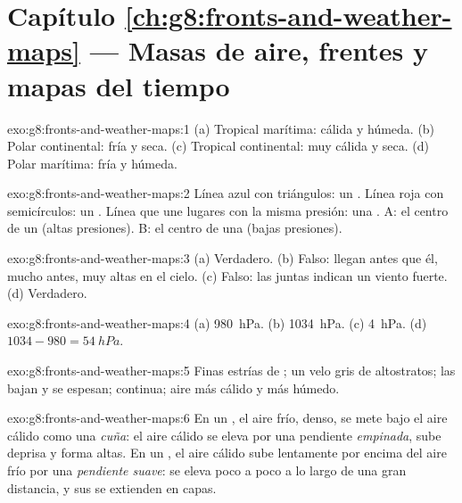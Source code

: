 \section*{Capítulo \ref{ch:g8:fronts-and-weather-maps} --- Masas de aire, frentes y mapas del tiempo}

\begin{solution}{exo:g8:fronts-and-weather-maps:1}
(a) Tropical marítima: cálida y húmeda. (b) Polar continental: fría y
seca. (c) Tropical continental: muy cálida y seca. (d) Polar marítima:
fría y húmeda.
\end{solution}

\begin{solution}{exo:g8:fronts-and-weather-maps:2}
Línea azul con triángulos: un . Línea roja con semicírculos: un
. Línea que une lugares con la misma presión: una . A:
el centro de un  (altas presiones). B: el centro de una 
(bajas presiones).
\end{solution}

\begin{solution}{exo:g8:fronts-and-weather-maps:3}
(a) Verdadero. (b) Falso: llegan antes que él, mucho antes, muy altas en
el cielo. (c) Falso: las  juntas indican un viento fuerte.
(d) Verdadero.
\end{solution}

\begin{solution}{exo:g8:fronts-and-weather-maps:4}
(a) \qty{980}{hPa}. (b) \qty{1034}{hPa}. (c) \qty{4}{hPa}. (d) $1034 -
980 = \qty{54}{hPa}$.
\end{solution}

\begin{solution}{exo:g8:fronts-and-weather-maps:5}
Finas estrías de ; un velo gris de altostratos; las  bajan y se
espesan;  continua; aire más cálido y más húmedo.
\end{solution}

\begin{solution}{exo:g8:fronts-and-weather-maps:6}
En un , el aire frío, denso, se mete bajo el aire cálido como
una \emph{cuña}: el aire cálido se eleva por una pendiente
\emph{empinada}, sube deprisa y forma  altas. En un , el
aire cálido sube lentamente por encima del aire frío por una
\emph{pendiente suave}: se eleva poco a poco a lo largo de una gran
distancia, y sus  se extienden en capas.
\end{solution}

